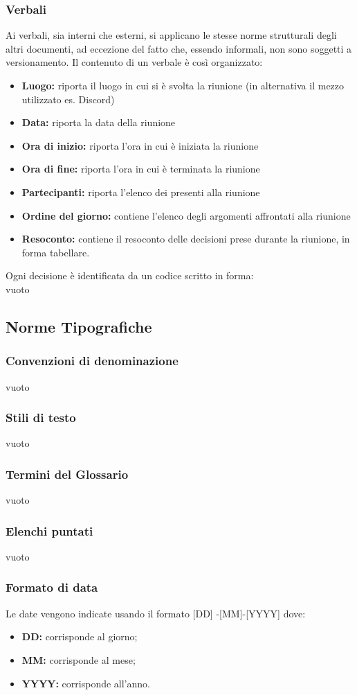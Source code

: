 \subsubsection{Verbali}
Ai verbali, sia interni che esterni, si applicano le stesse norme strutturali degli altri documenti, ad eccezione del fatto che, essendo informali, non sono soggetti a versionamento. Il contenuto di un verbale è così organizzato:
\begin{itemize}
\item \textbf{Luogo:} riporta il luogo in cui si è svolta la riunione (in alternativa il mezzo utilizzato es. Discord)
	\item \textbf{Data:} riporta la data della riunione
		\item \textbf{Ora di inizio:} riporta l'ora in cui è iniziata la riunione
			\item \textbf{Ora di fine:} riporta l'ora in cui è terminata la riunione
				\item \textbf{Partecipanti:} riporta l'elenco dei presenti alla riunione
					\item \textbf{Ordine del giorno:} contiene l'elenco degli argomenti affrontati alla riunione
						\item \textbf{Resoconto:}  contiene il resoconto delle decisioni prese durante la riunione, in forma tabellare.	
\end{itemize}
Ogni decisione è identificata da un codice scritto in forma: 
\\
{vuoto}
\subsection{Norme Tipografiche}
\subsubsection{Convenzioni di denominazione}
{vuoto}
\subsubsection{Stili di testo}
{vuoto}
\subsubsection{Termini del Glossario}
{vuoto}
\subsubsection{Elenchi puntati}
{vuoto}
\subsubsection{Formato di data}
Le date vengono indicate usando il formato
[DD] -[MM]-[YYYY] dove:
\\
\begin{itemize}
\item \textbf{DD:} corrisponde al giorno;
	\item \textbf{MM:} corrisponde al mese;
		\item \textbf{YYYY:} corrisponde all'anno.
\end{itemize}
